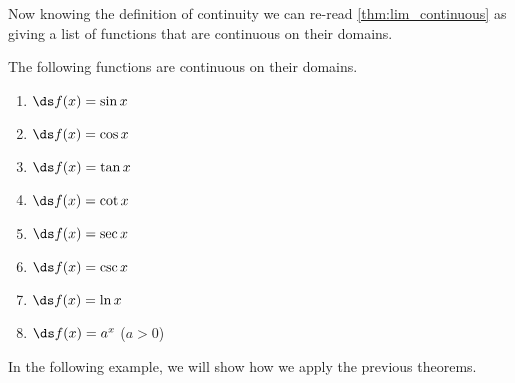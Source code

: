 Now knowing the definition of continuity we can re-read \autoref{thm:lim_continuous} as giving a list of functions that are continuous on their domains.

\begin{theorem}\label{thm:continuous_functions}
The following functions are continuous on their domains.
\begin{multicols}{2}
 \begin{enumerate}
		\item	$\ds f(x) = \sin x$
		\item	$\ds f(x) = \cos x$
		\item	$\ds f(x) = \tan x$
		\item	$\ds f(x) = \cot x$
		\item	$\ds f(x) = \sec x$
		\item	$\ds f(x) = \csc x$
		\item	$\ds f(x) = \ln x$
		\item	$\ds f(x) = a^x$ ($a>0$)
\end{enumerate}
\end{multicols}
\end{theorem}

In the following example, we will show how we apply the previous theorems.

